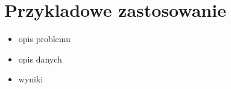 \section{Przykladowe zastosowanie}
\begin{itemize}
	\item opis problemu
	\item opis danych
	\item wyniki  
\end{itemize}

